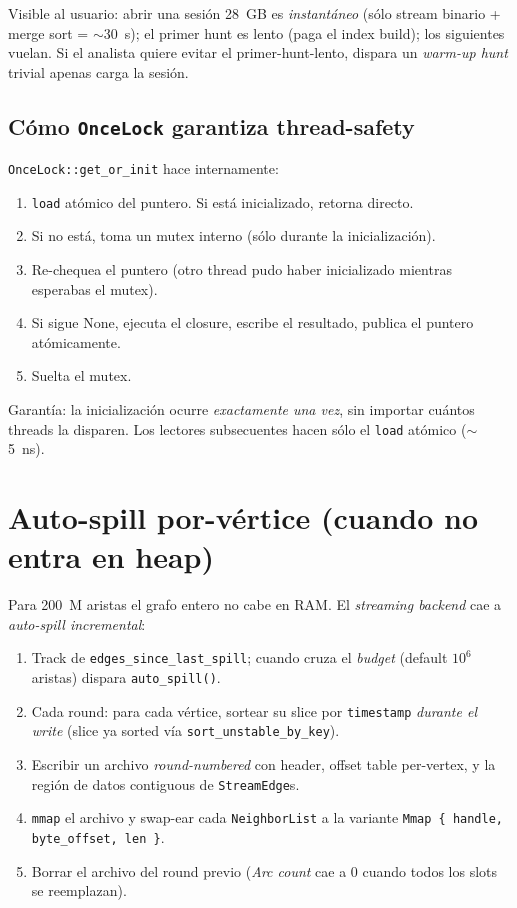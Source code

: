 \noindent
Visible al usuario: abrir una sesión 28~GB es \emph{instantáneo}
(sólo stream binario + merge sort = $\sim$30~s); el primer hunt es
lento (paga el index build); los siguientes vuelan. Si el analista
quiere evitar el primer-hunt-lento, dispara un \emph{warm-up hunt}
trivial apenas carga la sesión.

\subsection{Cómo \texttt{OnceLock} garantiza thread-safety}

\texttt{OnceLock::get\_or\_init} hace internamente:

\begin{enumerate}
    \item \texttt{load} atómico del puntero. Si está inicializado,
    retorna directo.
    \item Si no está, toma un mutex interno (sólo durante la
    inicialización).
    \item Re-chequea el puntero (otro thread pudo haber inicializado
    mientras esperabas el mutex).
    \item Si sigue None, ejecuta el closure, escribe el resultado,
    publica el puntero atómicamente.
    \item Suelta el mutex.
\end{enumerate}

\noindent
Garantía: la inicialización ocurre \emph{exactamente una vez}, sin
importar cuántos threads la disparen. Los lectores subsecuentes
hacen sólo el \texttt{load} atómico ($\sim$5~ns).

\section{Auto-spill por-vértice (cuando no entra en heap)}

Para 200~M aristas el grafo entero no cabe en RAM. El
\emph{streaming backend} cae a \emph{auto-spill incremental}:

\begin{enumerate}
    \item Track de \texttt{edges\_since\_last\_spill}; cuando cruza
    el \emph{budget} (default $10^6$ aristas) dispara
    \texttt{auto\_spill()}.
    \item Cada round: para cada vértice, sortear su slice por
    \texttt{timestamp} \emph{durante el write} (slice ya sorted vía
    \texttt{sort\_unstable\_by\_key}).
    \item Escribir un archivo \emph{round-numbered} con header,
    offset table per-vertex, y la región de datos contiguous
    de \texttt{StreamEdge}s.
    \item \texttt{mmap} el archivo y swap-ear cada
    \texttt{NeighborList} a la variante \texttt{Mmap \{ handle,
    byte\_offset, len \}}.
    \item Borrar el archivo del round previo (\emph{Arc count} cae
    a 0 cuando todos los slots se reemplazan).
\end{enumerate}

